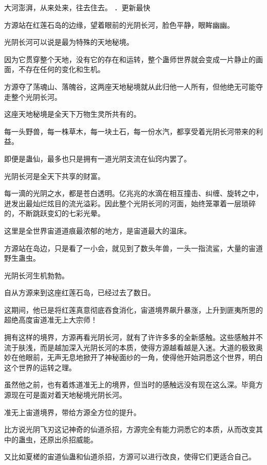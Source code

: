 
\begin{this_body}

大河澎湃，从来处来，往去住去。 ．更新最快

方源站在红莲石岛的边缘，望着眼前的光阴长河，脸色平静，眼眸幽幽。

光阴长河可以说是最为特殊的天地秘境。

因为它贯穿整个天地，没有它的存在和运转，整个蛊师世界就会变成一片静止的画面，不存在任何的变化和生机。

方源夺了荡魂山、落魄谷，这两座天地秘境就从此归他一人所有，但他绝无可能夺走整个光阴长河。

这座天地秘境是全天下万物生灵所共有的。

每一头野兽，每一株草木，每一块土石，每一份水汽，都享受着光阴长河带来的利益。

即便是蛊仙，最多也只是拥有一道光阴支流在仙窍内罢了。

光阴长河是全天下共享的财富。

每一滴的光阴之水，都是苍白透明。亿兆兆的水滴在相互撞击、纠缠、旋转之中，迸发出最灿烂炫目的流光溢彩。因此整个光阴长河的河面，始终笼罩着一层琐碎的，不断跳跃变幻的七彩光晕。

这里是全世界宙道道痕最浓郁的地方，是宙道最大的温床。

方源站在岛边，只是看了一小会，就见到了数头年兽，一头一指流鲨，大量的宙道野生蛊虫。

光阴长河生机勃勃。

自从方源来到这座红莲石岛，已经过去了数日。

这期间，他已是将红莲真意彻底吞食消化，宙道境界飙升暴涨，上升到匪夷所思的超绝高度宙道准无上大宗师！

拥有这样的境界，方源再看光阴长河，就有了许许多多的全新感触。这些感触并不流于肤浅，而是越加深入光阴长河的本质，使得方源越看越是入迷。大道的极致奥妙在他眼前，无声无息地掀开了神秘面纱的一角，使得他开始洞悉这个世界，明白这个世界的运转之理。

虽然他之前，也有着炼道准无上的境界，但当时的感触远没有现在这么深。毕竟方源现在可是面对着天地秘境光阴长河。

准无上宙道境界，带给方源全方位的提升。

比方说光阴飞刃这记神奇的仙道杀招，方源完全有能力洞悉它的本质，从而改变其中的蛊虫，还原出杀招威能。

又比如夏槎的宙道仙蛊和仙道杀招，方源可以进行改良，使得它们更适合自己。


\end{this_body}
